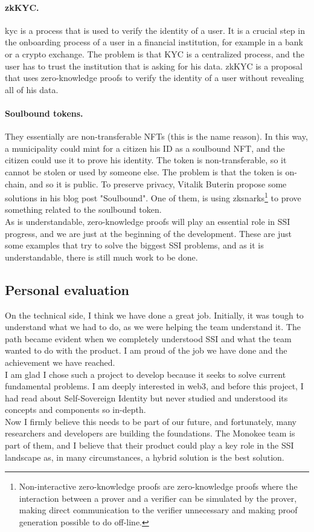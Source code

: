 \paragraph{zkKYC.} \acrfull{kyc} is a process that is used to verify the identity 
of a user. It is a crucial step in the onboarding process of a user in a financial 
institution, for example in a bank or a crypto exchange. The problem is that KYC is a 
centralized process, and the user has to trust the institution that is asking for his
data. zkKYC is a proposal that uses zero-knowledge proofs to verify the identity of a user
without revealing all of his data.

\paragraph{Soulbound tokens.} They essentially are non-transferable NFTs (this is the name 
reason). In this way, a municipality could mint for a citizen his ID as a soulbound NFT, 
and the citizen could use it to prove his identity. The token is non-transferable, so it 
cannot be stolen or used by someone else. The problem is that the token is on-chain, and 
so it is public. To preserve privacy, Vitalik Buterin propose some solutions in his blog 
post "Soulbound"\cite{article:soulbound}. One of them, is using \acrshort{zksnark}s\footnote{Non-interactive 
zero-knowledge proofs are zero-knowledge proofs where the interaction between a prover 
and a verifier can be simulated by the prover, making direct communication to 
the verifier unnecessary and making proof generation possible to do off-line.} to prove 
something related to the soulbound token.
\vspace{0.3cm}\\
As is understandable, zero-knowledge proofs will play an essential role in SSI progress, 
and we are just at the beginning of the development. These are just some examples that try to solve the 
biggest SSI problems, and as it is understandable, there is still much work to be done.

\subsection{Personal evaluation}
On the technical side, I think we have done a great job. Initially, it was tough to 
understand what we had to do, as we were helping the team understand it. The path became 
evident when we completely understood SSI and what the team wanted to do with the product.
I am proud of the job we have done and the achievement we have reached.\\
I am glad I chose such a project to develop because it seeks to solve current fundamental
problems. I am deeply interested in web3\cite{site:web3wiki}, and before this project, I had read about 
Self-Sovereign Identity but never studied and understood its concepts and components so 
in-depth.\\
Now I firmly believe this needs to be part of our future, and fortunately, many researchers 
and developers are building the foundations. The Monokee team is part of them, and I believe 
that their product could play a key role in the SSI landscape as, in many circumstances, 
a hybrid solution is the best solution.\\